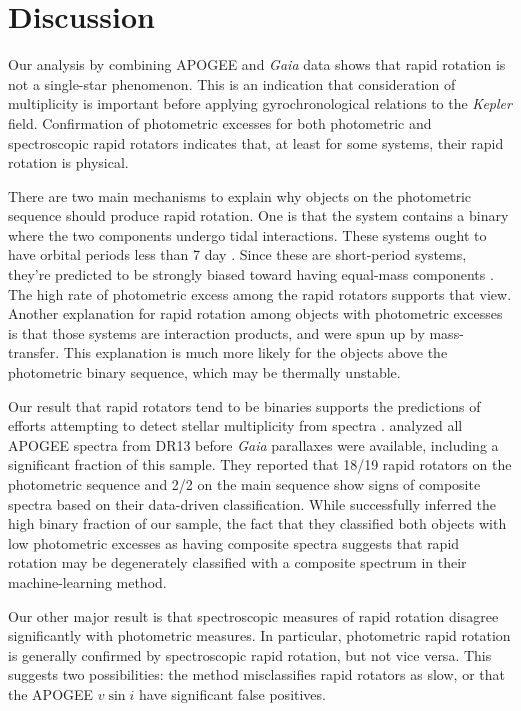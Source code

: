 \documentclass[manuscript]{aastex6}
\newcommand{\vsini}{\ensuremath{v \sin i}}
\newcommand{\Kepler}{\mbox{\textit{Kepler}}}
\newcommand{\Gaia}{\mbox{\textit{Gaia}}}
\begin{document}
\section{Discussion}
\label{sec:discussion}

Our analysis by combining APOGEE and \Gaia{} data shows that rapid
rotation is not a single-star phenomenon. This is an indication that
consideration of multiplicity is important before applying gyrochronological
relations to the \Kepler{} field. Confirmation of photometric excesses for 
both photometric and spectroscopic rapid rotators indicates that, at least
for some systems, their rapid rotation is physical.

There are two main mechanisms to explain why objects on the photometric
sequence should produce rapid rotation. One is that the system contains
a binary where the two components undergo tidal interactions. These
systems ought to have orbital periods less than 7 day
\citep{Raghavan10}. Since these are short-period systems, they're predicted 
to be strongly biased toward having equal-mass components
\citep{Bate02}. The high rate of photometric excess among the rapid
rotators supports that view. Another explanation for rapid rotation
among objects with photometric excesses is that those systems are
interaction products, and were spun up by mass-transfer. This
explanation is much more likely for the objects above the photometric
binary sequence, which may be thermally unstable.

Our result that rapid rotators tend to be binaries supports the
predictions of efforts attempting to detect stellar multiplicity from
spectra \citep{ElBadry18}. \citet{ElBadry18} analyzed all APOGEE spectra
from DR13 before \Gaia{} parallaxes were available, including a
significant fraction of this sample. They
reported that 18/19 rapid rotators on the photometric sequence and 2/2 on 
the main sequence show signs of composite spectra based on their
data-driven classification. While \citet{ElBadry18} successfully inferred the
high binary fraction of our sample, the fact that they classified both objects
with low photometric excesses as having composite spectra suggests that 
rapid rotation may be degenerately classified with a composite spectrum
in their machine-learning method.

Our other major result is that spectroscopic measures of rapid rotation 
disagree significantly with photometric measures. In particular,
photometric rapid rotation is generally confirmed by spectroscopic rapid
rotation, but not vice versa. This suggests two
possibilities: the \citet{McQuillan14} method misclassifies rapid
rotators as slow, or that the APOGEE \vsini{} have significant false
positives.
\end{document}
